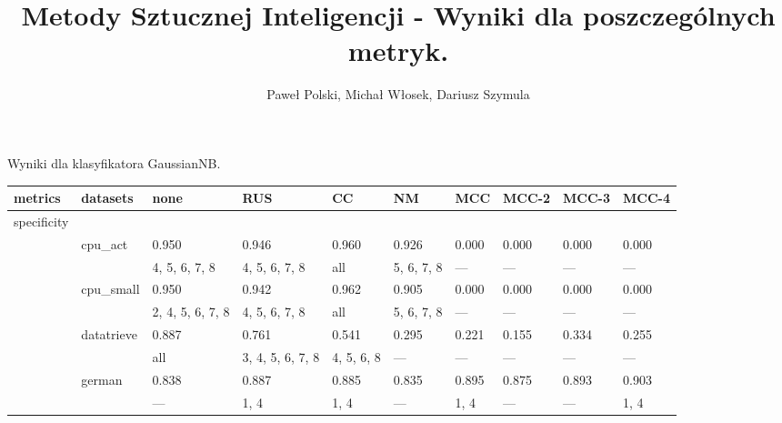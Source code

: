 \documentclass{article}
\begin{document}
\title{Metody Sztucznej Inteligencji - Wyniki dla poszczególnych metryk.}




\author{Paweł Polski, Michał Włosek, Dariusz Szymula}


\maketitle      
\begin{center}
\caption{Wyniki dla klasyfikatora GaussianNB.}\label{tab:my_label_GaussianNB}
\begin{longtable}{p{1.2cm}p{1.8cm}p{1cm}p{1cm}p{1cm}p{1cm}p{1cm}p{1cm}p{1cm}p{1cm}}
\hline
 metrics     & datasets     & none             & RUS              & CC               & NM               & MCC        & MCC-2         & MCC-3         & MCC-4         \\
\hline
\endhead
 specificity &              &                  &                  &                  &                  &            &               &               &               \\
             & cpu\_act      & 0.950            & 0.946            & 0.960            & 0.926            & 0.000      & 0.000         & 0.000         & 0.000         \\
             &              & 4, 5, 6, 7, 8    & 4, 5, 6, 7, 8    & all              & 5, 6, 7, 8       & ---        & ---           & ---           & ---           \\
             & cpu\_small    & 0.950            & 0.942            & 0.962            & 0.905            & 0.000      & 0.000         & 0.000         & 0.000         \\
             &              & 2, 4, 5, 6, 7, 8 & 4, 5, 6, 7, 8    & all              & 5, 6, 7, 8       & ---        & ---           & ---           & ---           \\
             & datatrieve   & 0.887            & 0.761            & 0.541            & 0.295            & 0.221      & 0.155         & 0.334         & 0.255         \\
             &              & all              & 3, 4, 5, 6, 7, 8 & 4, 5, 6, 8       & ---              & ---        & ---           & ---           & ---           \\
             & german       & 0.838            & 0.887            & 0.885            & 0.835            & 0.895      & 0.875         & 0.893         & 0.903         \\
             &              & ---              & 1, 4             & 1, 4             & ---              & 1, 4       & ---           & ---           & 1, 4          \\

\end{longtable}
\end{center}
\end{document}
